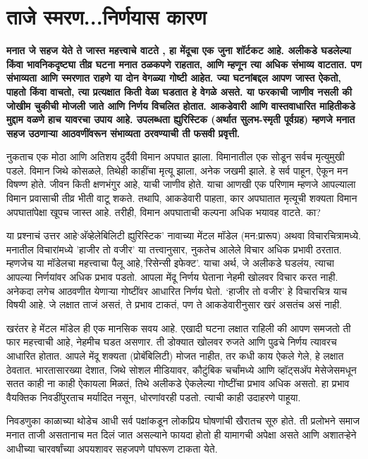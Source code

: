 \chapter{ताजे स्मरण...निर्णयास कारण }

\textcolor{blue!60!black}{\textbf{मनात जे सहज येते ते जास्त महत्त्वाचे वाटते , हा मेंदूचा एक जुना शॉर्टकट आहे. अलीकडे घडलेल्या किंवा भावनिकदृष्ट्या तीव्र घटना मनात ठळकपणे राहतात, आणि म्हणून त्या अधिक संभाव्य वाटतात. पण संभाव्यता आणि स्मरणात राहणे या दोन वेगळ्या गोष्टी आहेत. ज्या घटनांबद्दल आपण जास्त ऐकतो, पाहतो किंवा वाचतो, त्या प्रत्यक्षात किती वेळा घडतात हे वेगळे असते. या फरकाची जाणीव नसली की जोखीम चुकीची मोजली जाते आणि निर्णय विचलित होतात. आकडेवारी आणि वास्तवाधारित माहितीकडे मुद्दाम वळणे हाच यावरचा उपाय आहे. उपलब्धता ह्युरिस्टिक (अर्थात सुलभ-स्मृती पूर्वग्रह) म्हणजे मनात सहज उठणाऱ्या आठवणींवरून संभाव्यता ठरवण्याची ती फसवी प्रवृत्ती.}}

नुकताच एक मोठा आणि अतिशय दुर्दैवी विमान अपघात झाला. विमानातील एक सोडून सर्वच मृत्युमुखी पडले. विमान जिथे कोसळले, तिथेही काहींचा मृत्यू झाला, अनेक जखमी झाले. हे सर्व पाहून, ऐकून मन विषण्ण होते. जीवन किती क्षणभंगुर आहे, याची जाणीव होते. याचा आणखी एक परिणाम म्हणजे आपल्याला विमान प्रवासाची तीव्र भीती वाटू शकते. तथापि, आकडेवारी पाहता, कार अपघातात मृत्यूची शक्यता विमान अपघातांपेक्षा खूपच जास्त आहे. तरीही, विमान अपघाताची कल्पना अधिक भयावह वाटते. का?

या प्रश्नाचं उत्तर आहे‘अ‍ॅव्हेलेबिलिटी ह्युरिस्टिक’ नावाच्या मेंटल मॉडेल (मन:प्रारूप) अथवा विचारचित्रामध्ये. मनातील विचारांमध्ये 'हाजीर तो वजीर' या तत्त्वानुसार, नुकतेच आलेले विचार अधिक प्रभावी ठरतात. म्हणजेच या मॉडेलचा महत्त्वाचा पैलू आहे,'रिसेन्सी इफेक्ट'. याचा अर्थ, जे अलीकडे घडलंय, त्याचा आपल्या निर्णयांवर अधिक प्रभाव पडतो. आपला मेंदू निर्णय घेताना नेहमी खोलवर विचार करत नाही. अनेकदा लगेच आठवणीत येणाऱ्या गोष्टींवर आधारित निर्णय घेतो. ‘हाजीर तो वजीर’ हे विचारचित्र याच विषयी आहे. जे लक्षात ताजं असतं, ते प्रभाव टाकतं, पण ते आकडेवारीनुसार खरं असतंच असं नाही.

खरंतर हे मेंटल मॉडेल ही एक मानसिक सवय आहे. एखादी घटना लक्षात राहिली की आपण समजतो ती फार महत्त्वाची आहे, नेहमीच घडत असणार. ती डोक्यात खोलवर रुजते आणि पुढचे निर्णय त्यावरच आधारित होतात. आपले मेंदू शक्यता (प्रोबॅबिलिटी) मोजत नाहीत, तर कधी काय ऐकले गेले, हे लक्षात ठेवतात. भारतासारख्या देशात, जिथे सोशल मीडियावर, कौटुंबिक चर्चांमध्ये आणि व्हॉट्सअ‍ॅप मेसेजेसमधून सतत काही ना काही ऐकायला मिळतं, तिथे अलीकडे ऐकलेल्या गोष्टींचा प्रभाव अधिक असतो. हा प्रभाव वैयक्तिक निवडींपुरताच मर्यादित नसून, धोरणांवरही पडतो. त्याची काही उदाहरणे पाहूया. 

निवडणुका काळाच्या थोडेच आधी सर्व पक्षांकडून लोकप्रिय घोषणांची खैरातच सूरु होते. ती प्रलोभने समाज मनात ताजी असतानाच मत दिलं जात असल्याने फायदा होतो ही यामागची अपेक्षा असते आणि अशातऱ्हेने आधीच्या चारवर्षांच्या अपयशावर सहजपणे पांघरूण टाकता येते.

